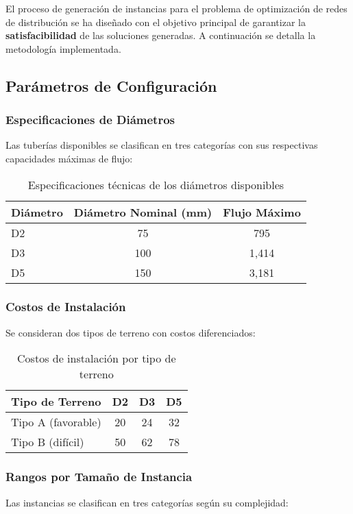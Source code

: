 \documentclass[12pt]{article}
\begin{document}
El proceso de generación de instancias para el problema de optimización de redes de distribución se ha diseñado con el objetivo principal de garantizar la \textbf{satisfacibilidad} de las soluciones generadas. A continuación se detalla la metodología implementada.

\subsection{Parámetros de Configuración}

\subsubsection{Especificaciones de Diámetros}
Las tuberías disponibles se clasifican en tres categorías con sus respectivas capacidades máximas de flujo:

\begin{table}[h]
\centering
\begin{tabular}{@{}lcc@{}}
\toprule
\textbf{Diámetro} & \textbf{Diámetro Nominal (mm)} & \textbf{Flujo Máximo} \\
\midrule
D2 & 75 & 795 \\
D3 & 100 & 1,414 \\
D5 & 150 & 3,181 \\
\bottomrule
\end{tabular}
\caption{Especificaciones técnicas de los diámetros disponibles}
\end{table}

\subsubsection{Costos de Instalación}
Se consideran dos tipos de terreno con costos diferenciados:

\begin{table}[h]
\centering
\begin{tabular}{@{}lccc@{}}
\toprule
\textbf{Tipo de Terreno} & \textbf{D2} & \textbf{D3} & \textbf{D5} \\
\midrule
Tipo A (favorable) & 20 & 24 & 32 \\
Tipo B (difícil) & 50 & 62 & 78 \\
\bottomrule
\end{tabular}
\caption{Costos de instalación por tipo de terreno}
\end{table}

\subsubsection{Rangos por Tamaño de Instancia}
Las instancias se clasifican en tres categorías según su complejidad:
\end{document}
